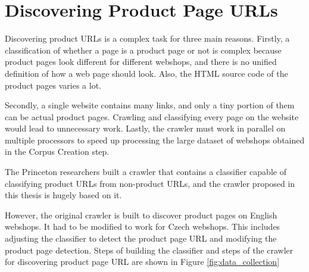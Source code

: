     \section{Discovering Product Page URLs}
        Discovering product URLs is a complex task for three main reasons. Firstly, a classification of whether a page is a product page or not is complex because product pages look different for different webshops, and there is no unified definition of how a web page should look. Also, the HTML source code of the product pages varies a lot.

        Secondly, a single website contains many links, and only a tiny portion of them can be actual product pages. Crawling and classifying every page on the website would lead to unnecessary work.
        Lastly, the crawler must work in parallel on multiple processors to speed up processing the large dataset of webshops obtained in the Corpus Creation step.

        The Princeton researchers built a crawler that contains a classifier capable of classifying product URLs from non-product URLs, and the crawler proposed in this thesis is hugely based on it.

        However, the original crawler is built to discover product pages on English webshops. It had to be modified to work for Czech webshops. This includes adjusting the classifier to detect the product page URL and modifying the product page detection. Steps of building the classifier and steps of the crawler for discovering product page URL are shown in Figure \ref{fig:data_collection}

